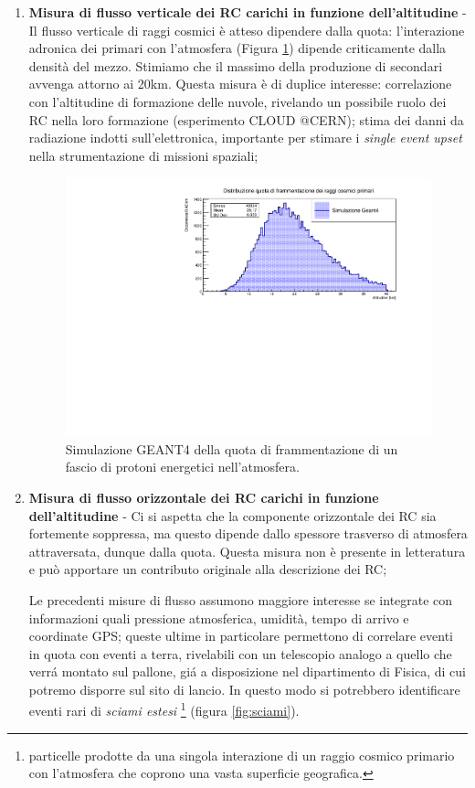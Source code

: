 \begin{enumerate}
    \item \textbf{Misura di flusso verticale dei RC carichi in funzione dell'altitudine} - Il flusso verticale di raggi cosmici è atteso dipendere dalla quota: l'interazione adronica dei primari con l'atmosfera (Figura \ref{frammentazione primari}) dipende criticamente dalla densità del mezzo. Stimiamo che il massimo della produzione di secondari avvenga attorno ai 20km. Questa misura è di duplice interesse: correlazione con l'altitudine di formazione delle nuvole, rivelando un possibile ruolo dei RC nella loro formazione (esperimento CLOUD @CERN); stima dei danni da radiazione indotti sull'elettronica, importante per stimare i \textit{single event upset} nella strumentazione di missioni spaziali;
    \begin{figure}
        \centering
        \includegraphics[width=0.9\linewidth]{Frammentazione_verticale.pdf}
        \caption{Simulazione GEANT4 della quota di frammentazione di un fascio di protoni energetici nell'atmosfera.}
        \label{frammentazione primari}
    \end{figure}
    
    \item \textbf{Misura di flusso orizzontale dei RC carichi in funzione dell'altitudine} - Ci si aspetta che la componente orizzontale dei RC sia fortemente soppressa, ma questo dipende dallo spessore trasverso di atmosfera attraversata, dunque dalla quota. Questa misura non è presente in letteratura e può apportare un contributo originale alla descrizione dei RC;
    
    Le precedenti misure di flusso assumono maggiore interesse se integrate con informazioni quali pressione atmosferica, umidità, tempo di arrivo e coordinate GPS; queste ultime in particolare permettono di correlare eventi in quota con eventi a terra, rivelabili con un telescopio analogo a quello che verr\'a montato sul pallone, gi\'a a disposizione nel dipartimento di Fisica, di cui potremo disporre sul sito di lancio. In questo modo si potrebbero identificare eventi rari di \emph{sciami estesi} \footnote{particelle prodotte da una singola interazione di un raggio cosmico primario con l'atmosfera che coprono una vasta superficie geografica.} (figura \ref{fig:sciami}). 
    

\end{enumerate}

